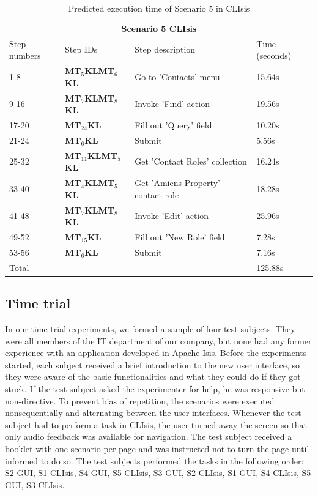 \begin{table}[H]
	\center
	
	\begin{tabular}{llll}
		\toprule
		\multicolumn{4}{c}{\textbf{Scenario 5 CLIsis}} \\
		\addlinespace[0.5em]
		Step numbers & Step IDs & Step description & Time (seconds) \\
		\midrule
		1-8 		& \textbf{MT$_5$KLMT$_6$KL}		& Go to 'Contacts' menu 						& 15.64s \\
		9-16		& \textbf{MT$_7$KLMT$_8$KL}		& Invoke 'Find' action							& 19.56s \\
		17-20	& \textbf{MT$_{24}$KL}					& Fill out 'Query' field							& 10.20s \\
		21-24	& \textbf{MT$_6$KL}							& Submit												& 5.56s \\
		25-32	& \textbf{MT$_{11}$KLMT$_5$KL}	& Get 'Contact Roles' collection			& 16.24s \\
		33-40	& \textbf{MT$_4$KLMT$_5$KL}		& Get 'Amiens Property' contact role	& 18.28s \\
		41-48	& \textbf{MT$_7$KLMT$_8$KL}		& Invoke 'Edit' action							& 25.96s \\
		49-52	& \textbf{MT$_{15}$KL}					& Fill out 'New Role' field						& 7.28s \\
		53-56	& \textbf{MT$_6$KL}							& Submit												& 7.16s \\
		\midrule
		\multicolumn{3}{l}{Total}																							& 125.88s\\
		\bottomrule
	\end{tabular}
	
	\caption{Predicted execution time of Scenario 5 in CLIsis}
	\label{table:gomsscenario5clisis}
\end{table}

\subsection{Time trial}
\label{subsection:timetrial_evaluation}
In our time trial experiments, we formed a sample of four test subjects. They were all members of the IT department of our company, but none had any former experience with an application developed in Apache Isis. Before the experiments started, each subject received a brief introduction to the new user interface, so they were aware of the basic functionalities and what they could do if they got stuck. If the test subject asked the experimenter for help, he was responsive but non-directive. To prevent bias of repetition, the scenarios were executed nonsequentially and alternating between the user interfaces. Whenever the test subject had to perform a task in CLIsis, the user turned away the screen so that only audio feedback was available for navigation. The test subject received a booklet with one scenario per page and was instructed not to turn the page until informed to do so. The test subjects performed the tasks in the following order: S2 GUI, S1 CLIsis, S4 GUI, S5 CLIsis, S3 GUI, S2 CLIsis, S1 GUI, S4 CLIsis, S5 GUI, S3 CLIsis.

